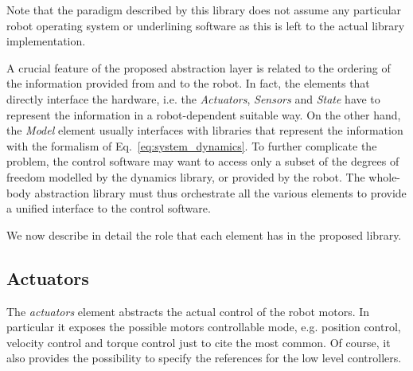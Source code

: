 Note that the paradigm described by this library does not assume any particular robot operating system or underlining software as this is left to the actual library implementation.


%
%
A crucial feature of the proposed abstraction layer is related to the ordering of the information provided from and to the robot.
In fact, the elements that directly interface the hardware, i.e. the \emph{Actuators}, \emph{Sensors} and \emph{State} have to represent the information in a robot-dependent suitable way.
On the other hand, the \emph{Model} element usually interfaces with libraries that represent the information with the formalism of Eq.~\eqref{eq:system_dynamics}.
To further complicate the problem, the control software may want to access only a subset of the degrees of freedom modelled by the dynamics library, or provided by the robot.
The whole-body abstraction library must thus orchestrate all the various elements to provide a unified interface to the control software.

We now describe in detail the role that each element has in the proposed library.

\subsection{Actuators} %
\label{sub:actuators}

The \emph{actuators} element abstracts the actual control of the robot motors.
In particular it exposes the possible motors controllable mode, e.g. position control, velocity control and torque control just to cite the most common.
Of course, it also provides the possibility to specify the references for the low level controllers.

